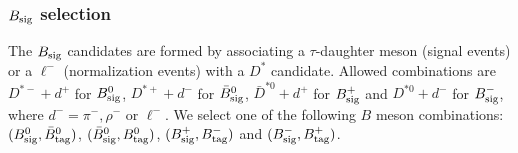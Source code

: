 \documentclass[aps,prd,twocolumn,superscriptaddress,showpacs,preprintnumbers,amsmath,amssymb]{revtex4-1}
\begin{document}
\subsubsection{$B_{\rm sig}$ selection}

The $B_{\rm sig}$ candidates are formed by associating a $\tau$-daughter meson (signal events) or a $\ell^-$ (normalization events) with a $D^*$ candidate. Allowed combinations are $D^{*-} + d^+$ for $B_{\rm sig}^0$, $D^{*+} + d^-$ for $\bar{B}_{\rm sig}^0$, $\bar{D}^{*0} + d^+$ for $B_{\rm sig}^+$ and $D^{*0} + d^-$ for $B_{\rm sig}^-$, where $d^- = \pi^-, \rho^-$ or $\ell^-$.  We select one of the following $B$ meson combinations: $(B_{\rm sig}^0, \bar{B}_{\rm tag}^0)$, $(\bar{B}_{\rm sig}^0, B_{\rm tag}^0)$, $(B_{\rm sig}^+, B_{\rm tag}^-)$ and $(B_{\rm sig}^-, B_{\rm tag}^+)$.
\end{document}

